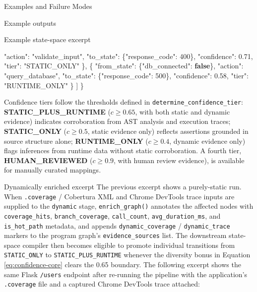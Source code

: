 \documentclass[
  ignorenonframetext,
]{beamer}
\newenvironment{Shaded}{}{}
\newcommand{\DataTypeTok}[1]{\textcolor[rgb]{0.56,0.13,0.00}{#1}}
\newcommand{\DecValTok}[1]{\textcolor[rgb]{0.25,0.63,0.44}{#1}}
\newcommand{\FloatTok}[1]{\textcolor[rgb]{0.25,0.63,0.44}{#1}}
\newcommand{\FunctionTok}[1]{\textcolor[rgb]{0.02,0.16,0.49}{#1}}
\newcommand{\KeywordTok}[1]{\textcolor[rgb]{0.00,0.44,0.13}{\textbf{#1}}}
\newcommand{\OtherTok}[1]{\textcolor[rgb]{0.00,0.44,0.13}{#1}}
\newcommand{\StringTok}[1]{\textcolor[rgb]{0.25,0.44,0.63}{#1}}
\begin{document}
\begin{frame}[fragile]{Examples and Failure Modes}
\begin{block}{Example outputs}
\begin{block}{Example state-space excerpt}
\begin{Shaded}
\begin{Highlighting}[]
      \DataTypeTok{"action"}\FunctionTok{:} \StringTok{"validate\_input"}\FunctionTok{,}
      \DataTypeTok{"to\_state"}\FunctionTok{:} \FunctionTok{\{}\DataTypeTok{"response\_code"}\FunctionTok{:} \DecValTok{400}\FunctionTok{\},}
      \DataTypeTok{"confidence"}\FunctionTok{:} \FloatTok{0.71}\FunctionTok{,}
      \DataTypeTok{"tier"}\FunctionTok{:} \StringTok{"STATIC\_ONLY"}
    \FunctionTok{\}}\OtherTok{,}
    \FunctionTok{\{}
      \DataTypeTok{"from\_state"}\FunctionTok{:} \FunctionTok{\{}\DataTypeTok{"db\_connected"}\FunctionTok{:} \KeywordTok{false}\FunctionTok{\},}
      \DataTypeTok{"action"}\FunctionTok{:} \StringTok{"query\_database"}\FunctionTok{,}
      \DataTypeTok{"to\_state"}\FunctionTok{:} \FunctionTok{\{}\DataTypeTok{"response\_code"}\FunctionTok{:} \DecValTok{500}\FunctionTok{\},}
      \DataTypeTok{"confidence"}\FunctionTok{:} \FloatTok{0.58}\FunctionTok{,}
      \DataTypeTok{"tier"}\FunctionTok{:} \StringTok{"RUNTIME\_ONLY"}
    \FunctionTok{\}}
  \OtherTok{]}
\FunctionTok{\}}
\end{Highlighting}
\end{Shaded}

Confidence tiers follow the thresholds defined in
\texttt{determine\_confidence\_tier}: \textbf{STATIC\_PLUS\_RUNTIME}
(\(c \geq 0.65\), with both static and dynamic evidence) indicates
corroboration from AST analysis and execution traces;
\textbf{STATIC\_ONLY} (\(c \geq 0.5\), static evidence only) reflects
assertions grounded in source structure alone; \textbf{RUNTIME\_ONLY}
(\(c \geq 0.4\), dynamic evidence only) flags inferences from runtime
data without static corroboration. A fourth tier,
\textbf{HUMAN\_REVIEWED} (\(c \geq 0.9\), with human review evidence),
is available for manually curated mappings.
\end{block}

\begin{block}{Dynamically enriched excerpt}
\protect{}\label{dynamically-enriched-excerpt}
The previous excerpt shows a purely-static run. When \texttt{.coverage}
/ Cobertura XML and Chrome DevTools trace inputs are supplied to the
\texttt{dynamic} stage, \texttt{enrich\_graph()} annotates the affected
nodes with \texttt{coverage\_hits}, \texttt{branch\_coverage},
\texttt{call\_count}, \texttt{avg\_duration\_ms}, and
\texttt{is\_hot\_path} metadata, and appends \texttt{dynamic\_coverage}
/ \texttt{dynamic\_trace} markers to the program graph's
\texttt{evidence\_sources} list. The downstream state-space compiler
then becomes eligible to promote individual transitions from
\texttt{STATIC\_ONLY} to \texttt{STATIC\_PLUS\_RUNTIME} whenever the
diversity bonus in Equation \ref{eq:confidence-core} clears the 0.65
boundary. The following excerpt shows the same Flask \texttt{/users}
endpoint after re-running the pipeline with the application's
\texttt{.coverage} file and a captured Chrome DevTools trace attached:


\end{block}
\end{block}
\end{frame}
\end{document}
